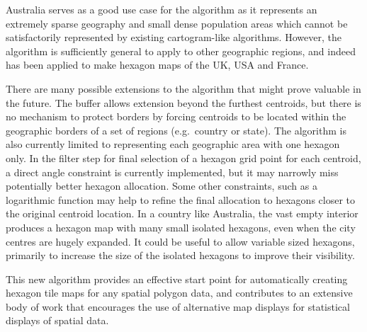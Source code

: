 Australia serves as a good use case for the algorithm as it represents
an extremely sparse geography and small dense population areas which
cannot be satisfactorily represented by existing cartogram-like
algorithms. However, the algorithm is sufficiently general to apply to
other geographic regions, and indeed has been applied to make hexagon
maps of the UK, USA and France.

There are many possible extensions to the algorithm that might prove
valuable in the future. The buffer allows extension beyond the furthest
centroids, but there is no mechanism to protect borders by forcing
centroids to be located within the geographic borders of a set of
regions (e.g.~country or state). The algorithm is also currently limited
to representing each geographic area with one hexagon only. In the
filter step for final selection of a hexagon grid point for each
centroid, a direct angle constraint is currently implemented, but it may
narrowly miss potentially better hexagon allocation. Some other
constraints, such as a logarithmic function may help to refine the final
allocation to hexagons closer to the original centroid location. In a
country like Australia, the vast empty interior produces a hexagon map
with many small isolated hexagons, even when the city centres are hugely
expanded. It could be useful to allow variable sized hexagons, primarily
to increase the size of the isolated hexagons to improve their
visibility.

This new algorithm provides an effective start point for automatically
creating hexagon tile maps for any spatial polygon data, and contributes
to an extensive body of work that encourages the use of alternative map
displays for statistical displays of spatial data.



\address{%
Stephanie Kobakian\\
\\%
Sydney, Australia\\
%
%
%
\href{mailto:stephanie.kobakian@gmail.com}{\nolinkurl{stephanie.kobakian@gmail.com}}%
}

\address{%
Dianne Cook\\
Monash University\\%
Department of Econometrics and Business Statistics\\
%
%
%
\href{mailto:dicook@monash.edu}{\nolinkurl{dicook@monash.edu}}%
}

\address{%
Earl Duncan\\
Queensland University of Technology\\%
School of Mathematical Sciences\\
%
%
%
\href{mailto:earl.duncan@qut.edu.au}{\nolinkurl{earl.duncan@qut.edu.au}}%
}
